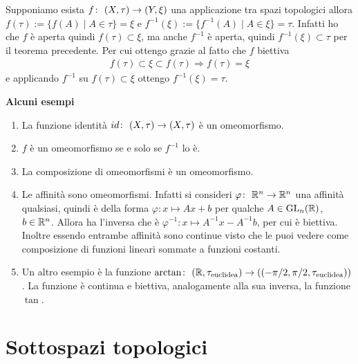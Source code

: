 \begin{remark}
	Supponiamo esista $f \colon\ (X,\tau) \rightarrow (Y,\xi)$ una applicazione tra spazi topologici allora $f(\tau) := \{ f(A) \; | \;  A \in \tau\} = \xi$ e $f^{-1}(\xi) := \{ f^{-1}(A) \; | \;  A \in \xi\} = \tau$. Infatti ho che $f$ è aperta quindi $f(\tau) \subset \xi$, ma anche $f^{-1}$ è aperta, quindi $f^{-1}(\xi) \subset \tau$ per il teorema precedente. Per cui ottengo grazie al fatto che $f$ biettiva
	\begin{equation}
	\begin{aligned}
		f(\tau) \subset \xi \subset f(\tau) \Longrightarrow f(\tau) = \xi
	\end{aligned}
	\end{equation} 
	e applicando $f^{-1}$ su $f(\tau) \subset \xi$ ottengo $f^{-1}(\xi) = \tau$.
\end{remark}

\textbf{Alcuni esempi}
\begin{enumerate}
	\item La funzione identità $id \colon\ (X,\tau) \rightarrow (X,\tau)$ è un omeomorfismo. 
	\item $f$ è un omeomorfismo se e solo se $f^{-1}$ lo è. 
	\item La composizione di omeomorfismi è un omeomorfismo.
	\item Le affinità sono omeomorfismi. Infatti si consideri $\varphi \colon\ \mathbb{R}^n \rightarrow \mathbb{R}^n$ una affinità qualsiasi, quindi è della forma $\varphi \colon x \mapsto Ax + b$ per qualche $A \in \operatorname{GL}_n(\mathbb{R})$, $b \in \mathbb{R}^n$. Allora ha l'inversa che è $\varphi^{-1} \colon x \mapsto A^{-1}x - A^{-1}b$, per cui è biettiva. Inoltre essendo entrambe affinità sono continue visto che le puoi vedere come composizione di funzioni lineari sommate a funzioni costanti.
	\item Un altro esempio è la funzione $\arctan \colon\ (\mathbb{R}, \tau_{\text{euclidea}}) \rightarrow ((-\pi/2,\pi/2, \tau_{\text{euclidea}}))$. La funzione è continua e biettiva, analogamente alla sua inversa, la funzione $\tan$.
\end{enumerate}

\section{Sottospazi topologici}

